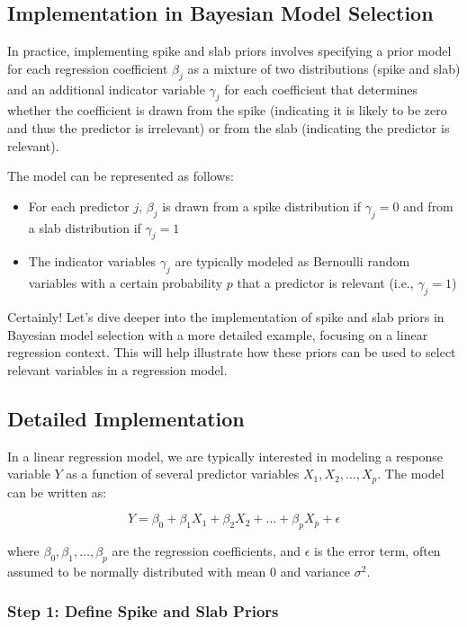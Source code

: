 \documentclass{article}
\begin{document}
\subsection{Implementation in Bayesian Model Selection}

In practice, implementing spike and slab priors involves specifying a prior model for each regression coefficient \( \beta_j \) as a mixture of two distributions (spike and slab) and an additional indicator variable \( \gamma_j \) for each coefficient that determines whether the coefficient is drawn from the spike (indicating it is likely to be zero and thus the predictor is irrelevant) or from the slab (indicating the predictor is relevant).

The model can be represented as follows:

\begin{itemize}
    \item For each predictor \( j \), \( \beta_j \) is drawn from a spike distribution if \( \gamma_j = 0 \) and from a slab distribution if \( \gamma_j = 1 \)
    \item The indicator variables \( \gamma_j \) are typically modeled as Bernoulli random variables with a certain probability \( p \) that a predictor is relevant (i.e., \( \gamma_j = 1 \))
\end{itemize}

Certainly! Let's dive deeper into the implementation of spike and slab priors in Bayesian model selection with a more detailed example, focusing on a linear regression context. This will help illustrate how these priors can be used to select relevant variables in a regression model.

\subsection{Detailed Implementation}

In a linear regression model, we are typically interested in modeling a response variable \(Y\) as a function of several predictor variables \(X_1, X_2, \ldots, X_p\). The model can be written as:

\[ Y = \beta_0 + \beta_1 X_1 + \beta_2 X_2 + \ldots + \beta_p X_p + \epsilon \]

where \( \beta_0, \beta_1, \ldots, \beta_p \) are the regression coefficients, and \( \epsilon \) is the error term, often assumed to be normally distributed with mean 0 and variance \(\sigma^2\).

\subsubsection{Step 1: Define Spike and Slab Priors}
\end{document}
